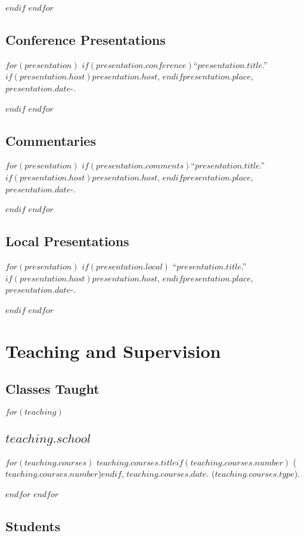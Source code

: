\documentclass[11pt]{article}
\def\printdate#1{\xprintdate#1-}
\def\xprintdate#1-#2-#3-{#1}
\begin{document}
$endif$
$endfor$

\subsection{Conference Presentations}

$for(presentation)$
$if(presentation.conference)$\ind ``$presentation.title$.'' $if(presentation.host)$\emph{$presentation.host$}, $endif$$presentation.place$, \printdate{$presentation.date$}.

$endif$
$endfor$

\subsection{Commentaries}

$for(presentation)$
$if(presentation.comments)$\ind ``$presentation.title$.'' $if(presentation.host)$\emph{$presentation.host$}, $endif$$presentation.place$, \printdate{$presentation.date$}.

$endif$
$endfor$

\subsection{Local Presentations}

$for(presentation)$
$if(presentation.local)$
\ind ``$presentation.title$.'' $if(presentation.host)$$presentation.host$, $endif$$presentation.place$, \printdate{$presentation.date$}.

$endif$
$endfor$

\section{Teaching and Supervision}

\subsection{Classes Taught}

$for(teaching)$
\subsection{$teaching.school$}
$for(teaching.courses)$
\ind $teaching.courses.title$$if(teaching.courses.number)$ ($teaching.courses.number$)$endif$, $teaching.courses.date$. ($teaching.courses.type$).

$endfor$
$endfor$

\subsection{Students}
\end{document}
